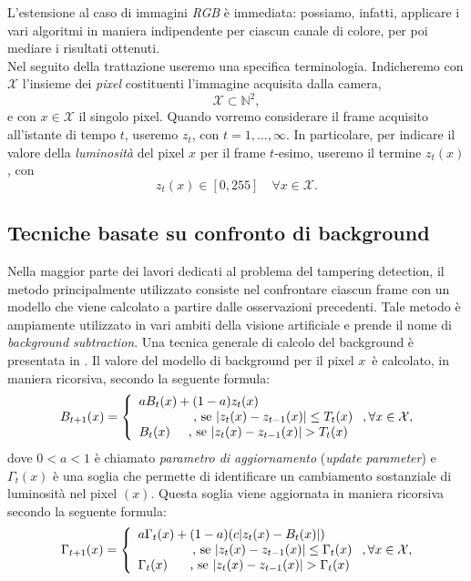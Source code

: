 L'estensione al caso di immagini \textit{RGB} \`e immediata: possiamo, infatti, applicare i vari algoritmi in maniera indipendente per ciascun canale di colore, per poi mediare i risultati ottenuti.\\
Nel seguito della trattazione useremo una specifica terminologia.
Indicheremo con $\mathcal{X}$ l'insieme dei \textit{pixel} costituenti l'immagine acquisita dalla camera,
\[ \mathcal{X} \subset \mathbb{N}^2, \]
e con $x \in \mathcal{X}$ il singolo pixel.
Quando vorremo considerare il frame acquisito all'istante di tempo $t$, useremo $z_t$, con $t=1,\dots , \infty$. 
In particolare, per indicare il valore della \textit{luminosit\`a} del pixel $x$ per il frame $t$-esimo, useremo il termine $z_t(x)$, con 
\[ z_t(x) \in [0, 255] \quad \forall x \in \mathcal{X}. \]

\subsection{Tecniche basate su confronto di background}
\label{background}
Nella maggior parte dei lavori dedicati al problema del tampering detection, il metodo principalmente utilizzato consiste nel confrontare ciascun frame con un modello che viene calcolato a partire dalle osservazioni precedenti.
Tale metodo \`e ampiamente utilizzato in vari ambiti della visione artificiale e prende il nome di \textit{background subtraction}.
Una tecnica generale di calcolo del background \`e presentata in \cite{aksay2007camera}.
Il valore del modello di background per il pixel $x$\ \`e calcolato, in maniera ricorsiva, secondo la seguente formula:
\[
\label{eq:background}
B_{t + 1}(x)=\left\{ \begin{array} {lcl}
aB_t(x)+ (1-a)z_t(x) \\
\mbox{\hspace{1.5cm}, se } |z_t(x) - z_{t-1}(x)|\leq T_t(x) \\
B_t(x) \mbox{\hspace{0.5cm}, se } |z_t(x) - z_{t-1}(x)|>T_t(x)\end{array} \right. , \forall x \in \mathcal{X},
\]
dove $0 < a < 1$ \`e chiamato \textit{parametro di aggiornamento} (\textit{update parameter}) e $\Gamma_t(x)$ \`e una soglia che permette di identificare un cambiamento sostanziale di luminosit\`a nel pixel $(x)$. 
 Questa soglia viene aggiornata in maniera ricorsiva secondo la seguente formula:
  \[
  \label{eq:backgroundThreshUpd}
  \Gamma_{t + 1}(x)=\left\{ \begin{array} {lcl}
  a\Gamma_t(x)+ (1-a)(c |z_t(x) - B_t(x)|) \\
  \mbox{\hspace{1.5cm}, se	}  |z_t(x) - z_{t-1}(x)|\leq \Gamma_t(x) \\
  \Gamma_t(x) \mbox{	\hspace{0.5cm}, se	}  |z_t(x) - z_{t-1}(x)|>\Gamma_t(x) \end{array} \right. ,\forall x \in \mathcal{X},
  \]
